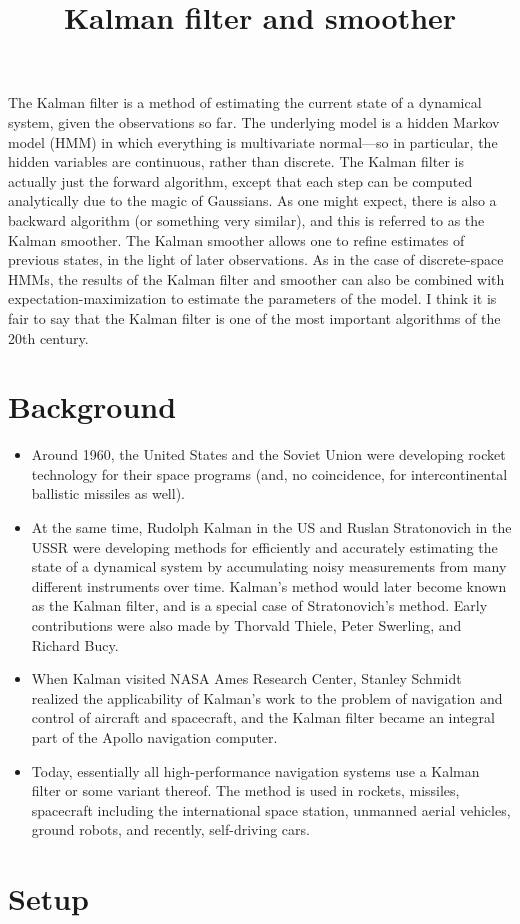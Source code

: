 \documentclass[12pt]{article}
\title{Kalman filter and smoother}
\author{}
\date{}
\begin{document}
\maketitle
\tableofcontents
\thispagestyle{firststyle}


\vspace{2em}


The Kalman filter is a method of estimating the current state of a dynamical system, given the observations so far. The underlying model is a hidden Markov model (HMM) in which everything is multivariate normal---so in particular, the hidden variables are continuous, rather than discrete. The Kalman filter is actually just the forward algorithm, except that each step can be computed analytically due to the magic of Gaussians. As one might expect, there is also a backward algorithm (or something very similar), and this is referred to as the Kalman smoother.  The Kalman smoother allows one to refine estimates of previous states, in the light of later observations. As in the case of discrete-space HMMs, the results of the Kalman filter and smoother can also be combined with expectation-maximization to estimate the parameters of the model. I think it is fair to say that the Kalman filter is one of the most important algorithms of the 20th century.

\newpage

\section{Background}

\begin{itemize}
\item Around 1960, the United States and the Soviet Union were developing rocket technology for their space programs (and, no coincidence, for intercontinental ballistic missiles as well).
\item At the same time, Rudolph Kalman in the US and Ruslan Stratonovich in the USSR were developing methods for efficiently and accurately estimating the state of a dynamical system by accumulating noisy measurements from many different instruments over time. Kalman's method would later become known as the Kalman filter, and is a special case of Stratonovich's method.  Early contributions were also made by Thorvald Thiele, Peter Swerling, and Richard Bucy.
\item When Kalman visited NASA Ames Research Center, Stanley Schmidt realized the applicability of Kalman's work to the problem of navigation and control of aircraft and spacecraft, and the Kalman filter became an integral part of the Apollo navigation computer.
\item Today, essentially all high-performance navigation systems use a Kalman filter or some variant thereof.  The method is used in rockets, missiles, spacecraft including the international space station, unmanned aerial vehicles, ground robots, and recently, self-driving cars.
\end{itemize}


\section{Setup}
\end{document}
